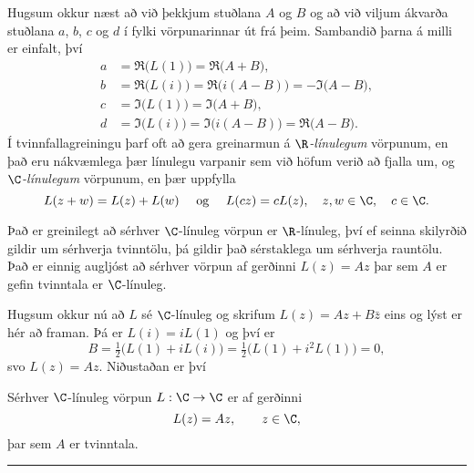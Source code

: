 Hugsum okkur næst að við þekkjum stuðlana  $A$ og $B$ og
að við viljum ákvarða stuðlana $a$, $b$, $c$ og $d$ í 
fylki vörpunarinnar út frá þeim. Sambandið þarna á milli er
einfalt, því
\begin{align*}
a&=\Re\big(L(1)\big)=\Re\big(A+B\big), \\
b&=\Re\big(L(i)\big)=\Re\big(i(A-B)\big)=-\Im\big(A-B\big),\\
c&=\Im\big(L(1)\big)=\Im\big(A+B\big),\\
d&=\Im\big(L(i)\big)=\Im\big(i(A-B)\big)=\Re\big(A-B\big).
\end{align*}
Í tvinnfallagreiningu þarf oft að gera greinarmun á {\it
$\R$-línulegum}
vörpunum, en það eru nákvæmlega þær línulegu varpanir sem við höfum
verið að fjalla um, og {\it $\C$-línulegum} vörpunum, en þær uppfylla
\begin{equation*}
L(z+w)=L(z)+L(w) \quad \text{ og } \quad 
L(cz)=cL(z), \quad z,w\in \C, \quad c\in \C.
\end{equation*}


Það er greinilegt að sérhver $\C$-línuleg vörpun er $\R$-línuleg, því ef
seinna skilyrðið gildir um sérhverja tvinntölu, þá gildir það sérstaklega um
sérhverja rauntölu.  Það er einnig augljóst að sérhver vörpun af
gerðinni $L(z)=Az$ þar sem $A$ er gefin tvinntala er $\C$-línuleg.


Hugsum okkur nú að $L$ sé $\C$-línuleg og skrifum
$L(z)=Az+B\bar z$ eins og lýst er hér að framan.  Þá er 
$L(i)=iL(1)$ og því er 
$$
B=\tfrac 12\big(L(1)+iL(i)\big)= \tfrac 12\big(L(1)+i^2L(1)\big)=0,
$$
svo $L(z)=Az$.  Niðustaðan er því 

\begin{se} Sérhver $\C$-línuleg vörpun $L:\C\to \C$ er af gerðinni
$$
L(z)=Az, \qquad z\in \C,
$$
þar sem $A$ er tvinntala.
\end{se}

\bigskip\hrule\bigskip

